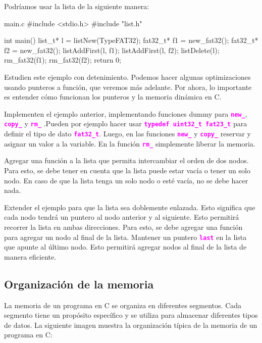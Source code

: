 \documentclass[]{scrartcl}
\newcommand{\hl}[1]{\textcolor{magenta}{\textbf{\texttt{#1}}}}
\begin{document}
Podríamos usar la lista de la siguiente manera:

\begin{cbox}[]{main.c}
  #include <stdio.h>
  #include "list.h"

  int main() {
    list_t* l = listNew(TypeFAT32);
    fat32_t* f1 = new_fat32();
    fat32_t* f2 = new_fat32();
    listAddFirst(l, f1);
    listAddFirst(l, f2);
    listDelete(l);
    rm_fat32(f1);
    rm_fat32(f2);
    return 0;
  }
\end{cbox}

Estudien este ejemplo con detenimiento. Podemos hacer algunas optimizaciones usando punteros a función, que veremos más adelante. Por ahora, lo importante es entender cómo funcionan los punteros y la memoria dinámica en C.

\begin{exbox}
  Implementen el ejemplo anterior, implementando funciones dummy para \hl{new\_}, \hl{copy\_} y \hl{rm\_} .Pueden por ejemplo hacer usar \hl{typedef uint32\_t fat23\_t} para definir el tipo de dato \hl{fat32\_t}. Luego, en las funciones \hl{new\_} y \hl{copy\_} reservar y asignar un valor a la variable. En la función \hl{rm\_} simplemente liberar la memoria.
\end{exbox}

\begin{exbox}
  Agregar una función a la lista que permita intercambiar el orden de dos nodos. Para esto, se debe tener en cuenta que la lista puede estar vacía o tener un solo nodo. En caso de que la lista tenga un solo nodo o esté vacía, no se debe hacer nada.
\end{exbox}

\begin{exbox}
  Extender el ejemplo para que la lista sea doblemente enlazada. Esto significa que cada nodo tendrá un puntero al nodo anterior y al siguiente. Esto permitirá recorrer la lista en ambas direcciones. Para esto, se debe agregar una función para agregar un nodo al final de la lista. Mantener un puntero \hl{last} en la lista que apunte al último nodo. Esto permitirá agregar nodos al final de la lista de manera eficiente.
\end{exbox}

\subsection*{Organización de la memoria}

La memoria de un programa en C se organiza en diferentes segmentos. Cada segmento tiene un propósito específico y se utiliza para almacenar diferentes tipos de datos. La siguiente imagen muestra la organización típica de la memoria de un programa en C:
\end{document}
